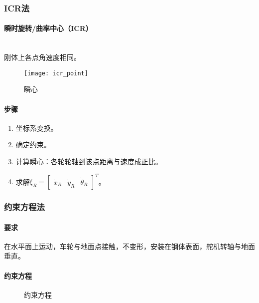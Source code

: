 \documentclass[
12pt, %
a4paper, 
oneside, %
headinclude,footinclude, %
]{scrartcl}
\begin{document}
\subsubsection[ICR法]{ICR法}
\begin{minipage}{0.35\textwidth}
\paragraph{瞬时旋转/曲率中心（ICR）}~\\
刚体上各点角速度相同。
\begin{figure}[H]
\centering 
\texttt{[image: icr\_point]} 
\caption[瞬心]{瞬心}
\end{figure}
\end{minipage}
\hfill
\begin{minipage}{0.6\textwidth}
\paragraph{步骤}
\begin{enumerate}
\item 坐标系变换。
\item 确定约束。
\item 计算瞬心：各轮轮轴到该点距离与速度成正比。
\item 求解$ \xi_R = \begin{bmatrix} \dot{x}_R & \dot{y}_R & \dot{\theta}_R \end{bmatrix}^T $。
\end{enumerate}
\end{minipage}
\subsubsection[约束方程法]{约束方程法}
\paragraph{要求}
在水平面上运动，车轮与地面点接触，不变形，安装在钢体表面，舵机转轴与地面垂直。
\paragraph{约束方程}
\begin{figure}[H]
\centering
{} \quad
{} \quad
{}
\caption[约束方程]{约束方程}
\end{figure}
\end{document}
